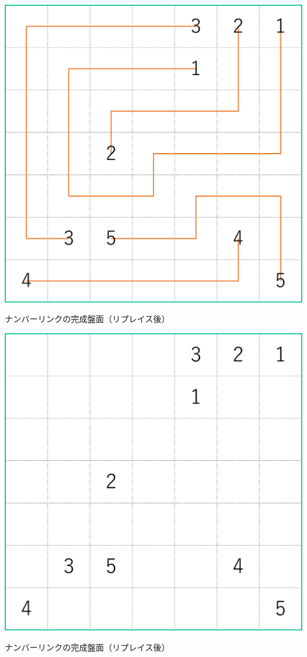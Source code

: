 \begin{clearpagefigure}
  \includegraphics[width=0.85\linewidth,clip]{fig/NumberLinkReplace.eps}
  \caption{ナンバーリンクの完成盤面（リプレイス後）}
  \label{figure:NumberLinkReplace}
\end{clearpagefigure}

\begin{clearpagefigure}
  \includegraphics[width=0.85\linewidth,clip]{fig/NumberLinkQuestionReplace.eps}
  \caption{ナンバーリンクの完成盤面（リプレイス後）}
  \label{figure:NumberLinkQuestionReplace}
\end{clearpagefigure}

